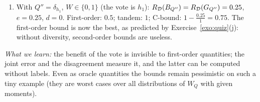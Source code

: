 \documentclass[11pt]{article}
\newcounter{exo}
\begin{document}
\begin{solution}
\begin{enumerate}
      $e_{Q'}=\frac{0.09+3\times0.01+4\times0.1225}8=\frac{0.61}8=0.07625$ and $d_{Q'}=2(0.25-0.07625)=0.3475$ (check with $D$:
      $6\times0.01\times0.25+12\times0.035\times0.5+2\times0.1225\times0.5=0.015+0.21+0.1225=0.3475$). Tandem: $0.305$; C-bound:
      $1-\frac{0.25}{1-0.695}=0.180$; $\mu^\star=\frac{0.125-0.07625}{0.25}=0.195$. \emph{Why:} $h_1,h_2,h_3$ all err on point~1; moving weight
      towards $h_4,h_5$, whose errors are not shared, decreases the joint error and increases the disagreement. The
      first-order bound only sees the average risk, which is the same for all voters.
\item With $Q''=\delta_{h_1}$, $W\in\{0,1\}$ (the vote is $h_1$): $R_{\mathcal{D}}(B_{Q''})=R_{\mathcal{D}}(G_{Q''})=0.25$, $e=0.25$, $d=0$. First-order: $0.5$;
      tandem: $1$; C-bound: $1-\frac{0.25}{1}=0.75$. The first-order bound is now the best, as predicted by
      Exercise~\ref{exo:quiz}(j): without diversity, second-order bounds are useless.
\end{enumerate}
\emph{What we learn:} the benefit of the vote is invisible to first-order quantities; the joint error and the
disagreement measure it, and the latter can be computed without labels. Even as oracle quantities the bounds remain
pessimistic on such a tiny example (they are worst cases over all distributions of $W_Q$ with given moments).
\end{solution}
\end{document}
